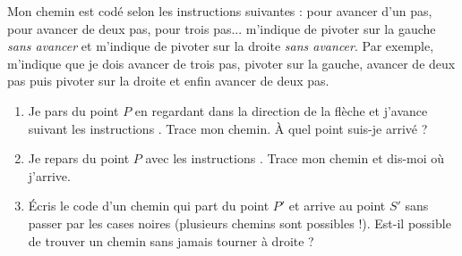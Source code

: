 \documentclass[class=report,crop=false, 12pt]{standalone}
\begin{document}
\begin{activite}
Mon chemin est codé selon les instructions suivantes :  pour avancer d’un pas,  pour avancer de deux pas,  pour trois pas...  m’indique de pivoter sur la gauche \emph{sans avancer} et  m’indique de pivoter sur la droite \emph{sans avancer}. Par exemple,  m’indique que je dois avancer de trois pas, pivoter sur la gauche, avancer de deux pas puis pivoter sur la droite et enfin avancer de deux pas.
\begin{enumerate}
  \item Je pars du point $P$ en regardant dans la direction de la flèche et j’avance suivant les instructions . Trace mon chemin. À quel point suis-je arrivé ?
  
  \item Je repars du point $P$ avec les instructions . Trace mon chemin et dis-moi où j’arrive.
  

  \item Écris le code d'un chemin qui part du point $P'$ et arrive au point $S'$ sans passer par les cases noires (plusieurs chemins sont possibles !). Est-il possible de trouver un chemin sans jamais tourner à droite ?

  
\end{enumerate}
\end{activite}
\end{document}
